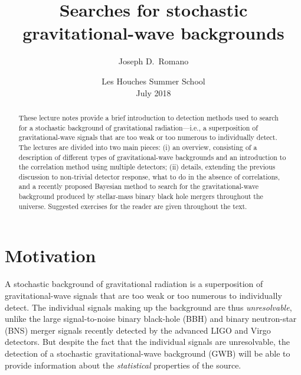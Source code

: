 \documentclass[11pt]{article}
\numberwithin{equation}{section}
\begin{document}
\title{Searches for stochastic gravitational-wave backgrounds}
\author{Joseph D.\ Romano}
\date{Les Houches Summer School\\
July 2018}

\maketitle

\begin{abstract}
These lecture notes provide a brief introduction 
to detection methods used to search for a stochastic 
background of gravitational radiation---i.e., a 
superposition of gravitational-wave signals that are 
too weak or too numerous to individually detect.
The lectures are divided into two main pieces:
(i) an overview, consisting of a description of different 
types of gravitational-wave backgrounds and an introduction 
to the correlation method using multiple detectors;
(ii) details, extending the previous discussion to 
non-trivial detector response, what to do in the absence
of correlations, and a recently proposed Bayesian method 
to search for the gravitational-wave background produced 
by stellar-mass binary black hole mergers throughout the 
universe.
Suggested exercises for the reader are given throughout 
the text.
\end{abstract}

\pagebreak
\tableofcontents
\pagebreak


\section{Motivation}
\label{s:motivation}

A stochastic background of gravitational radiation 
is a superposition of gravitational-wave signals that
are too weak or too numerous to individually detect.
The individual signals making up the background are thus
{\em unresolvable}, unlike the large signal-to-noise 
binary black-hole (BBH) and binary neutron-star (BNS)
merger signals recently detected by the advanced LIGO 
and Virgo detectors.
But despite the fact that the individual signals are 
unresolvable, the detection of a stochastic 
gravitational-wave background (GWB) will 
be able to provide information about the 
{\em statistical} properties of the source.
\end{document}
